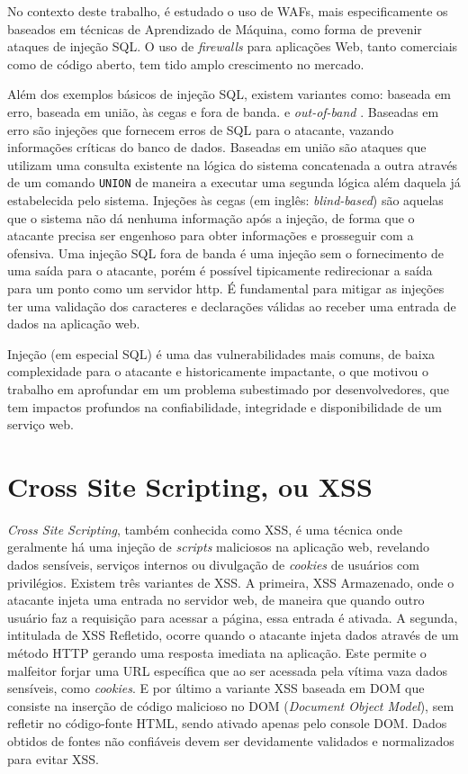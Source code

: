 No contexto deste trabalho, é estudado o uso de WAFs, mais especificamente os baseados em técnicas de Aprendizado de Máquina, como forma de prevenir ataques de injeção SQL. O uso de \textit{firewalls} para aplicações Web, tanto comerciais como de código aberto, tem tido amplo crescimento no mercado.

Além dos exemplos básicos de injeção SQL, existem variantes \cite{bach_owasp2020understanding} como: baseada em erro, baseada em união, às cegas e fora de banda. e \textit{out-of-band} \cite{out_of_band_sql_invicti}. Baseadas em erro são injeções que fornecem erros de SQL para o atacante, vazando informações críticas do banco de dados. Baseadas em união são ataques que utilizam uma consulta existente na lógica do sistema concatenada a outra através de um comando \verb+UNION+ de maneira a executar uma segunda lógica além daquela já estabelecida pelo sistema. Injeções às cegas (em inglês: \textit{blind-based}) são aquelas que o sistema não dá nenhuma informação após a injeção, de forma que o atacante precisa ser engenhoso para obter informações e prosseguir com a ofensiva. Uma injeção SQL fora de banda  é uma injeção sem o fornecimento de uma saída para o atacante, porém é possível tipicamente redirecionar a saída para um ponto como um servidor http.
É fundamental para mitigar as injeções ter uma validação dos caracteres e declarações válidas ao receber uma entrada de dados na aplicação web.

Injeção (em especial SQL) é uma das vulnerabilidades mais comuns, de baixa complexidade para o atacante e historicamente impactante, o que motivou o trabalho em aprofundar em um problema subestimado por desenvolvedores, que tem impactos profundos na confiabilidade, integridade e disponibilidade de um serviço web.

\section{Cross Site Scripting, ou XSS}
\textit{Cross Site Scripting}, também conhecida como XSS, é uma técnica onde geralmente há uma injeção de \textit{scripts} maliciosos na aplicação web, revelando dados sensíveis, serviços internos ou divulgação de \textit{cookies} de usuários com privilégios.
Existem três variantes de XSS. A primeira, XSS Armazenado, onde o atacante injeta uma entrada no servidor web, de maneira que quando outro usuário faz a requisição para acessar a página, essa entrada é ativada. A segunda, intitulada de XSS Refletido, ocorre quando o atacante injeta dados através de um método HTTP gerando uma resposta imediata na aplicação. Este permite o malfeitor forjar uma URL específica que ao ser acessada pela vítima vaza dados sensíveis, como \textit{cookies}. E por último a variante XSS baseada em DOM que consiste na inserção de código malicioso no DOM (\textit{Document Object Model}), sem refletir no código-fonte HTML, sendo ativado apenas pelo console DOM.
Dados obtidos de fontes não confiáveis devem ser devidamente validados e normalizados para evitar XSS.

